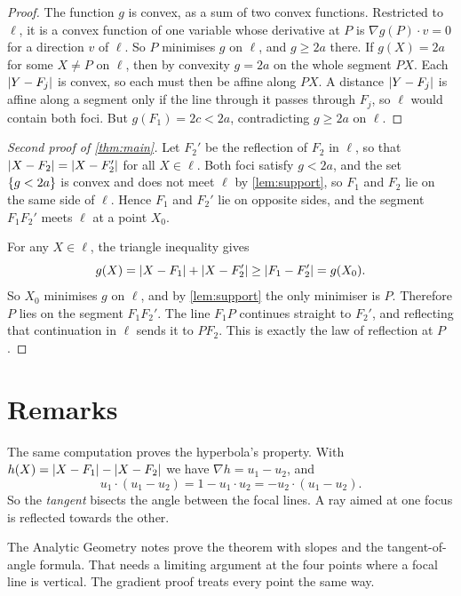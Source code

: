\documentclass[11pt,a4paper]{article}
\begin{document}
\begin{proof}
  The function $g$ is convex, as a sum of two convex functions. Restricted to $\ell$,
  it is a convex function of one variable whose derivative at $P$ is
  $\nabla g(P) \cdot v = 0$ for a direction $v$ of $\ell$. So $P$ minimises $g$ on
  $\ell$, and $g \geq 2a$ there. If $g(X) = 2a$ for some $X \neq P$ on $\ell$, then
  by convexity $g = 2a$ on the whole segment $PX$. Each $\lvert Y - F_j\rvert$ is convex, so
  each must then be affine along $PX$. A distance $\lvert Y - F_j\rvert$ is affine along a
  segment only if the line through it passes through $F_j$, so $\ell$ would contain
  both foci. But $g(F_1) = 2c < 2a$, contradicting $g \geq 2a$ on $\ell$.
\end{proof}

\begin{proof}[Second proof of \cref{thm:main}]
  Let $F_2'$ be the reflection of $F_2$ in $\ell$, so that
  $\lvert X - F_2\rvert = \lvert X - F_2'\rvert$ for all $X \in \ell$. Both foci satisfy
  $g < 2a$, and the set $\{g < 2a\}$ is convex and does not meet $\ell$ by
  \cref{lem:support}, so $F_1$ and $F_2$ lie on the same side of $\ell$. Hence $F_1$
  and $F_2'$ lie on opposite sides, and the segment $F_1F_2'$ meets $\ell$ at a point
  $X_0$.

  For any $X \in \ell$, the triangle inequality gives
  \[
    g(X) = \lvert X - F_1\rvert + \lvert X - F_2'\rvert \geq \lvert F_1 - F_2'\rvert = g(X_0).
  \]
  So $X_0$ minimises $g$ on $\ell$, and by \cref{lem:support} the only minimiser is
  $P$. Therefore $P$ lies on the segment $F_1F_2'$. The line $F_1P$ continues
  straight to $F_2'$, and reflecting that continuation in $\ell$ sends it to $PF_2$.
  This is exactly the law of reflection at $P$.
\end{proof}

\section{Remarks}

\begin{remark}
  The same computation proves the hyperbola's property. With
  $h(X) = \lvert X - F_1\rvert - \lvert X - F_2\rvert$ we have $\nabla h = u_1 - u_2$, and
  \[
    u_1 \cdot (u_1 - u_2) = 1 - u_1 \cdot u_2 = -u_2 \cdot (u_1 - u_2).
  \]
  So the \emph{tangent} bisects the angle between the focal lines. A ray aimed at
  one focus is reflected towards the other.
\end{remark}

\begin{remark}
  The Analytic Geometry notes prove the theorem with slopes and the tangent-of-angle
  formula. That needs a limiting argument at the four points where a focal line is
  vertical. The gradient proof treats every point the same way.
\end{remark}
\end{document}
